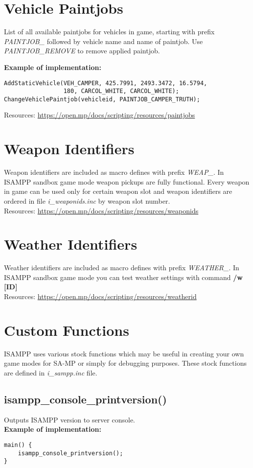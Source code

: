 \documentclass{article}
\begin{document}
\section{Vehicle Paintjobs}
\begin{sloppypar}
List of all available paintjobs for vehicles in game, starting with prefix \textit{PAINTJOB\_} followed by vehicle name and name of paintjob. Use \textit{PAINTJOB\_REMOVE} to remove applied paintjob.
\end{sloppypar}
\bigskip
\noindent \textbf{Example of implementation:}
\begin{verbatim}
AddStaticVehicle(VEH_CAMPER, 425.7991, 2493.3472, 16.5794,
                 180, CARCOL_WHITE, CARCOL_WHITE);
ChangeVehiclePaintjob(vehicleid, PAINTJOB_CAMPER_TRUTH);
\end{verbatim}
\bigskip
Resources: \url{https://open.mp/docs/scripting/resources/paintjobs}


\section{Weapon Identifiers}
Weapon identifiers are included as macro defines with prefix \textit{WEAP\_}. In ISAMPP sandbox game mode weapon pickups are fully functional. Every weapon in game can be used only for certain weapon slot and weapon identifiers are ordered in file \textit{i\_weaponids.inc} by weapon slot number.
\bigskip
\\Resources: \url{https://open.mp/docs/scripting/resources/weaponids}


\section{Weather Identifiers}
Weather identifiers are included as macro defines with prefix \textit{WEATHER\_}. In ISAMPP sandbox game mode you can test weather settings with command \textbf{/w [ID]}
\bigskip
\\Resources: \url{https://open.mp/docs/scripting/resources/weatherid}


\newpage
\section{Custom Functions}
ISAMPP uses various stock functions which may be useful in creating your own game modes for SA-MP or simply for debugging purposes. These stock functions are defined in \textit{i\_sampp.inc} file.


\subsection{isampp\_console\_printversion()}
Outputs ISAMPP version to server console.
\bigskip
\\\textbf{Example of implementation:}
\begin{verbatim}
main() {
    isampp_console_printversion();
}
\end{verbatim}
\end{document}
